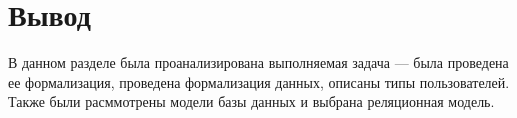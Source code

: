 







\section{Вывод}

В данном разделе была проанализирована выполняемая задача --- была проведена ее формализация, проведена формализация данных, описаны типы пользователей. Также были расммотрены модели базы данных и выбрана реляционная модель.
